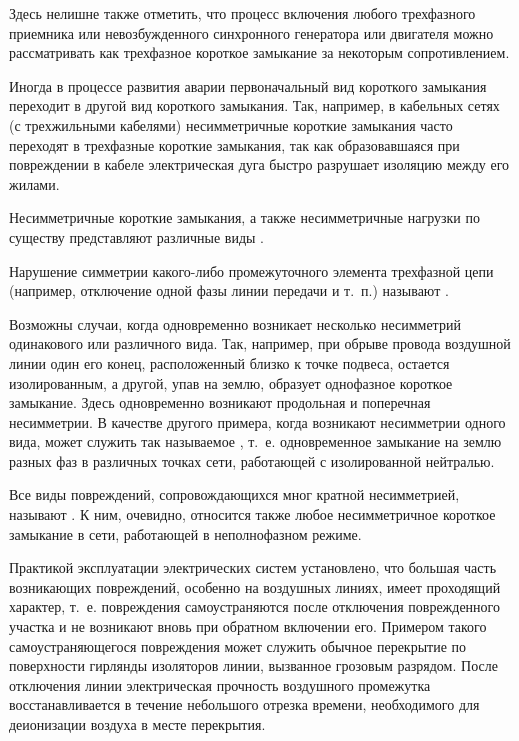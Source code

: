 Здесь нелишне также отметить, что процесс включения любого трехфазного приемника или невозбужденного синхронного генератора или двигателя можно рассматривать как трехфазное короткое замыкание за некоторым сопротивлением.

Иногда в процессе развития аварии первоначальный вид короткого замыкания переходит в другой вид короткого замыкания. Так, например, в кабельных сетях (с трехжильными кабелями) несимметричные короткие замыкания часто переходят в трехфазные короткие замыкания, так как образовавшаяся при повреждении в кабеле электрическая дуга быстро разрушает изоляцию между его жилами.

Несимметричные короткие замыкания, а также несимметричные нагрузки по существу представляют различные виды .

Нарушение симметрии какого-либо промежуточного элемента трехфазной цепи (например, отключение одной фазы линии передачи и т.~п.) называют .

Возможны случаи, когда одновременно возникает несколько несимметрий одинакового или различного вида. Так, например, при обрыве провода воздушной линии один его конец, расположенный близко к точке подвеса, остается изолированным, а другой, упав на землю, образует однофазное короткое замыкание. Здесь одновременно возникают продольная и поперечная несимметрии. В качестве другого примера, когда возникают несимметрии одного вида, может служить так называемое , т.~е. одновременное замыкание на землю разных фаз в различных точках сети, работающей с изолированной нейтралью.

Все виды повреждений, сопровождающихся мног кратной несимметрией, называют . К ним, очевидно, относится также любое несимметричное короткое замыкание в сети, работающей в неполнофазном режиме.

Практикой эксплуатации электрических систем установлено, что большая часть возникающих повреждений, особенно на воздушных линиях, имеет проходящий характер, т.~е. повреждения самоустраняются после отключения поврежденного участка и не возникают вновь при обратном включении его. Примером такого самоустраняющегося повреждения может служить обычное перекрытие по поверхности гирлянды изоляторов линии, вызванное грозовым разрядом. После отключения линии электрическая прочность воздушного промежутка восстанавливается в течение небольшого отрезка времени, необходимого для деионизации воздуха в месте перекрытия.

